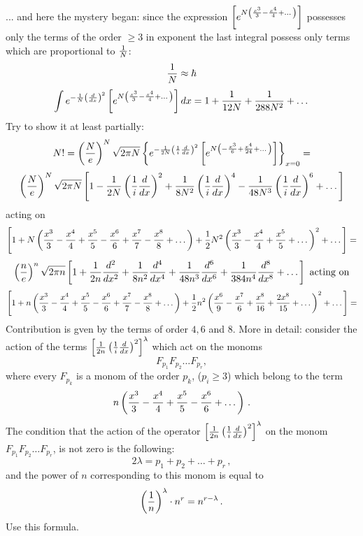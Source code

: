 ... and here the mystery began: since the expression
$    \left[
     e^{
      N
     \left(
 {x^3\over 3 }
 -{x^4\over 4 }+\dots
     \right)
 } 
\right]$ possesses only the terms of the order $\geq 3$
in exponent the last integral possess only terms
which are proportional to $1\over N $:
         $$
	 {1\over N}\approx \hbar
	 $$
    $$
\int e^{-{1\over N}\left({d\over dx}\right)^2}
    \left[
     e^{
      N
     \left(
 {x^3\over 3 }
 -{x^4\over 4 }+\dots
     \right)
 } 
\right]dx=
1+{1\over 12 N}+{1\over 288 N^2}+\dots
    $$
Try to show it at least partially:
 $$
N!=
\left(N\over e\right)^N\sqrt {2\pi N}
\left\{
 e^{-{1\over 2N}
  \left(
   {1\over i}
{d\over dx}
    \right)^2
      }
    \left[
     e^{
      N
     \left(
- {x^3\over 6 }
 +{x^4\over 24 }+\dots
     \right)
 } 
\right]
   \right\}_{x=0}=
     $$
    $$
\left(N\over e\right)^N\sqrt {2\pi N}
\left[1
       -
      {1\over 2N}
  \left(
    {1\over i}
{d\over dx}
     \right)^2
     +
  {1\over 8N^2}
  \left(
    {1\over i}
{d\over dx}
     \right)^4
   -
  {1\over 48N^3}
  \left(
    {1\over i}
{d\over dx}
     \right)^6
         +\dots
\right]
     $$
 acting on    
       $$
  \left[
   1+
 N\left(
    {x^3\over 3}
     -
   {x^4\over 4}
     +
 {x^5\over 5}
     -
 {x^6\over 6}
     +
 {x^7\over 7}
     -
 {x^8\over 8}
     +
    \dots
    \right)
    +
     {1\over 2}N^2
 \left(
    {x^3\over 3}
     -
   {x^4\over 4}
     +
 {x^5\over 5}
      +\dots
    \right)^2
      +\dots
   \right]=
       $$
        $$
\left(n\over e\right)^n\sqrt {2\pi n}
\left[1
       +
      {1\over 2n}
    {d^2\over dx^2}
     +
  {1\over 8n^2}
    {d^4\over dx^4}
        +
  {1\over 48n^3}
   {d^6\over dx^6}
        +
   {1\over 384n^4}
   {d^8\over dx^8}
         +\dots
\right]\,\,
 \hbox {acting on}
     $$
       $$
  \left[
   1+
 n\left(
    {x^3\over 3}
     -
   {x^4\over 4}
     +
 {x^5\over 5}
     -
 {x^6\over 6}
     +
 {x^7\over 7}
     -
 {x^8\over 8}
     +
    \dots
    \right)
    +
     {1\over 2}n^2
 \left(
    {x^6\over 9}
     -
   {x^7\over 6}
     +
 {x^8\over 16}
    +
 {2x^8\over 15}
      +\dots
    \right)^2
      +\dots
   \right]
      =
       $$
Contribution is gven by the terms of order
   $4,6$ and $8$. More in detail:
  consider  the action of the terms
   $\left[
  {1\over 2n}\left({1\over i}{d\over dx}\right)^2
    \right]^\lambda$
which act on the monoms
     $$
     F_{p_1}F_{p_2}\dots F_{p_r},
     $$
 where every $F_{p_k}$ is a monom of the order $p_k$,
  ($p_i\geq 3$)  which belong to  the term
     $$
   n\left(
   {x^3\over 3}
    -
   {x^4\over 4}
     +
  {x^5\over 5}
    -
   {x^6\over 6}
    +\dots
   \right)\,.
    $$
The condition that the action
of the operator 
   $\left[
  {1\over 2n}\left({1\over i}{d\over dx}\right)^2
    \right]^\lambda$
on the monom 
$F_{p_1}F_{p_2}\dots F_{p_r}$,
is not zero is the following:
    $$
   2\lambda=p_1+p_2+\dots+p_r\,,
     $$
and the power of $n$ corresponding to this monom is
equal to 
      $$
\left({1\over n}\right)^\lambda \cdot 
   n^r=n^{r-\lambda}\,.
       $$
Use this formula.

